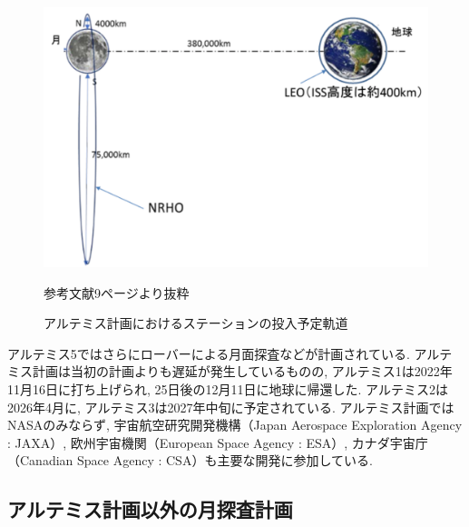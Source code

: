 \begin{figure}[tbh]
    \centering
    \includegraphics[width=0.7\textheight]{img/artemis_moon_station_orbit.pdf}
    \caption{アルテミス計画におけるステーションの投入予定軌道}
    \label{fig:artemis_moon_station_orbit}
    \begin{minipage}{\textwidth}
        \centering
        \vspace{3mm}
        \fontsize{10pt}{12pt}\selectfont
        参考文献\cite{kiban_dai48}9ページより抜粋
    \end{minipage}
\end{figure}

アルテミス5ではさらにローバーによる月面探査などが計画されている. 
アルテミス計画は当初の計画よりも遅延が発生しているものの, 
アルテミス1は2022年11月16日に打ち上げられ, 25日後の12月11日に地球に帰還した. 
アルテミス2は2026年4月に, アルテミス3は2027年中旬に予定されている. 
アルテミス計画ではNASAのみならず, 
宇宙航空研究開発機構（Japan Aerospace Exploration Agency : JAXA）, 
欧州宇宙機関（European Space Agency : ESA）, 
カナダ宇宙庁（Canadian Space Agency : CSA）も主要な開発に参加している. 
\cite{jaxa2021}

\subsection{アルテミス計画以外の月探査計画}
\label{section:アルテミス計画以外の月探査計画}


